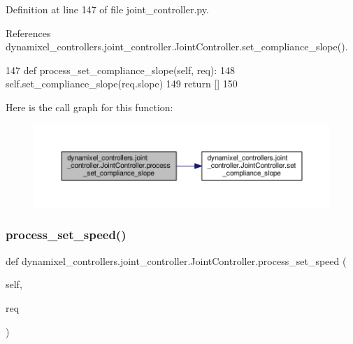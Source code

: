 Definition at line 147 of file joint\+\_\+controller.\+py.



References dynamixel\+\_\+controllers.\+joint\+\_\+controller.\+Joint\+Controller.\+set\+\_\+compliance\+\_\+slope().


\begin{DoxyCode}
147     \textcolor{keyword}{def }process\_set\_compliance\_slope(self, req):
148         self.set\_compliance\_slope(req.slope)
149         \textcolor{keywordflow}{return} []
150 
\end{DoxyCode}
Here is the call graph for this function\+:
\nopagebreak
\begin{figure}[H]
\begin{center}
\leavevmode
\includegraphics[width=350pt]{d3/dcd/classdynamixel__controllers_1_1joint__controller_1_1_joint_controller_a6390c0c20afc0581dd3b1122c894d175_cgraph}
\end{center}
\end{figure}
\mbox{\label{classdynamixel__controllers_1_1joint__controller_1_1_joint_controller_a97af096c1566307859ed168c900fa8a6}} 
\subsubsection{\texorpdfstring{process\+\_\+set\+\_\+speed()}{process\_set\_speed()}}
{\footnotesize\ttfamily def dynamixel\+\_\+controllers.\+joint\+\_\+controller.\+Joint\+Controller.\+process\+\_\+set\+\_\+speed (\begin{DoxyParamCaption}\item[{}]{self,  }\item[{}]{req }\end{DoxyParamCaption})\hspace{0.3cm}{\ttfamily [inherited]}}



